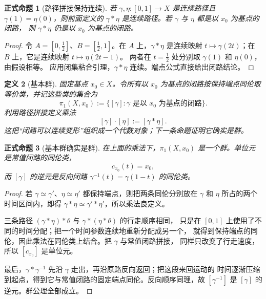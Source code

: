 \documentclass[UTF8,fontset=none,a4paper,11pt]{ctexart}
\theoremstyle{foundation-definition}
\newtheorem{definition}{定义}[section]
\theoremstyle{foundation-theorem}
\theoremstyle{foundation-proposition}
\newtheorem{proposition}[definition]{正式命题}
\theoremstyle{foundation-example}
\theoremstyle{foundation-remark}
\theoremstyle{foundation-theorem}
\begin{document}
\begin{proposition}[路径拼接保持连续]
\label{prop:path-concatenation-continuous}
若 \(\gamma,\eta:[0,1]\to X\) 是连续路径且 \(\gamma(1)=\eta(0)\)，则前面定义的
\(\gamma*\eta\) 是连续路径。若 \(\gamma\) 与 \(\eta\) 都是以 \(x_0\) 为基点的闭路，
则 \(\gamma*\eta\) 仍是以 \(x_0\) 为基点的闭路。
\end{proposition}

\begin{proof}
令 \(A=[0,\tfrac12]\)、\(B=[\tfrac12,1]\)。在 \(A\) 上，\(\gamma*\eta\) 是连续映射
\(t\mapsto\gamma(2t)\)；在 \(B\) 上，它是连续映射 \(t\mapsto\eta(2t-1)\)。
两者在 \(t=\tfrac12\) 处分别取 \(\gamma(1)\) 和 \(\eta(0)\)，由假设相等。
应用闭集粘合引理，\(\gamma*\eta\) 连续。端点公式直接给出闭路结论。
\end{proof}

\begin{definition}[基本群]\label{def:fundamental-group}
固定基点 \(x_0\in X\)。令所有以 \(x_0\) 为基点的闭路按保持端点同伦取等价类，并记这些类的集合为
\[
\pi_1(X,x_0):=\{[\gamma]:\gamma\text{ 是以 }x_0\text{ 为基点的闭路}\}.
\]
利用路径拼接定义乘法
\[
[\gamma]\cdot[\eta]:=[\gamma*\eta].
\]
这把“闭路可以连续变形”组织成一个代数对象；下一条命题证明它确实是群。
\end{definition}

\begin{proposition}[基本群确实是群]\label{prop:fundamental-group-group}
在上面的乘法下，\(\pi_1(X,x_0)\) 是一个群。单位元是常值闭路的同伦类，
\[
c_{x_0}(t)=x_0,
\]
而 \([\gamma]\) 的逆元是反向闭路 \(\gamma^{-1}(t)=\gamma(1-t)\) 的同伦类。
\end{proposition}

\begin{proof}
若 \(\gamma\simeq\gamma'\)、\(\eta\simeq\eta'\) 都保持端点，则把两条同伦分别放在
\(\gamma\) 和 \(\eta\) 所占的两个时间区间内，即得
\(\gamma*\eta\simeq\gamma'*\eta'\)，所以乘法良定义。

三条路径 \((\gamma*\eta)*\theta\) 与 \(\gamma*(\eta*\theta)\) 的行走顺序相同，
只是在 \([0,1]\) 上使用了不同的时间分配；把一个时间参数连续地重新分配成另一个，
就得到保持端点的同伦，因此乘法在同伦类上结合。把 \(\gamma\) 与常值闭路拼接，
同样只改变了行走速度，所以 \([c_{x_0}]\) 是单位元。

最后，\(\gamma*\gamma^{-1}\) 先沿 \(\gamma\) 走出，再沿原路反向返回；把这段来回运动的
时间逐渐压缩到起点，得到它与常值闭路的固定端点同伦。反向顺序同理，故
\([\gamma^{-1}]\) 是 \([\gamma]\) 的逆元。群公理全部成立。
\end{proof}
\end{document}
